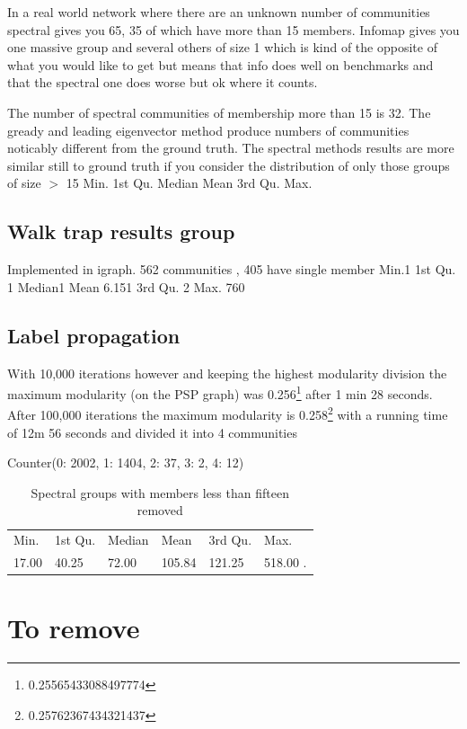 In a real world network where there are an unknown number of communities spectral gives you 65, 35 of which have more than 15 members. Infomap gives you one massive group and several others of size 1 which is kind of the opposite of what you would like to get but means that info does well on benchmarks and that the spectral one does worse but ok where it counts. 

The number of spectral communities of membership more than 15 is 32. The gready and leading eigenvector method produce numbers of communities noticably different from the ground truth. The spectral methods results are more similar still to ground truth if you consider the distribution of only those groups of size $>$ 15    Min. 1st Qu.  Median    Mean 3rd Qu.    Max. 
 
\subsection{Walk trap results group}
\label{sec:walk trap results}
Implemented in igraph. 562 communities , 405 have single member  Min.1 1st Qu.  1 Median1    Mean 6.151 3rd Qu. 2   Max. 760 

\subsection{Label propagation}

With 10,000 iterations however and keeping the highest modularity division the maximum modularity (on the PSP graph) was 0.256\footnote{0.25565433088497774} after 1 min 28 seconds. After 100,000 iterations the maximum modularity is 0.258\footnote{0.25762367434321437} with a running time of 12m 56 seconds and divided it into 4 communities

Counter(0: 2002, 1: 1404, 2: 37, 3: 2, 4: 12)


\begin{table}[]
    \centering
    \begin{tabular}{llllll}
      Min. &1st Qu.&  Median    &Mean &3rd Qu. &   Max.    \\
       17.00&  40.25&   72.00 & 105.84 &  121.25 & 518.00 .\\
         
    \end{tabular}
    \caption{Spectral groups with members less than fifteen removed}
    \label{tab:my_label}
\end{table}  

\section{To remove}
